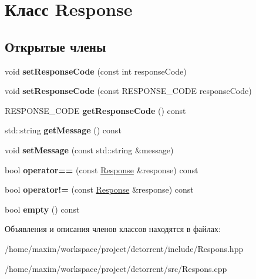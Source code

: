 \hypertarget{class_response}{}\section{Класс Response}
\label{class_response}
\subsection*{Открытые члены}
\begin{DoxyCompactItemize}
\item 
\mbox{\label{class_response_a5027d8f799de6c3b363f346a0938ba24}} 
void {\bfseries set\+Response\+Code} (const int response\+Code)
\item 
\mbox{\label{class_response_a173e4ecbd97fc996f994cefd6a96151c}} 
void {\bfseries set\+Response\+Code} (const R\+E\+S\+P\+O\+N\+S\+E\+\_\+\+C\+O\+DE response\+Code)
\item 
\mbox{\label{class_response_a6c6264ecd2a5b3dd810088ab60454e06}} 
R\+E\+S\+P\+O\+N\+S\+E\+\_\+\+C\+O\+DE {\bfseries get\+Response\+Code} () const
\item 
\mbox{\label{class_response_a3c1d22536ecef18e21cc01fe10ad5703}} 
std\+::string {\bfseries get\+Message} () const
\item 
\mbox{\label{class_response_ad8851ad3fb70be26ba3454f4fa65f50a}} 
void {\bfseries set\+Message} (const std\+::string \&message)
\item 
\mbox{\label{class_response_a2370772ff85de1e6b7cea030a49af69a}} 
bool {\bfseries operator==} (const \hyperlink{class_response}{Response} \&response) const
\item 
\mbox{\label{class_response_a5a71397a64da703f9cfd4573397132d7}} 
bool {\bfseries operator!=} (const \hyperlink{class_response}{Response} \&response) const
\item 
\mbox{\label{class_response_aa77324541c1140d20c66174f37736ba7}} 
bool {\bfseries empty} () const
\end{DoxyCompactItemize}


Объявления и описания членов классов находятся в файлах\+:\begin{DoxyCompactItemize}
\item 
/home/maxim/workspace/project/dctorrent/include/Respons.\+hpp\item 
/home/maxim/workspace/project/dctorrent/src/Respons.\+cpp\end{DoxyCompactItemize}
